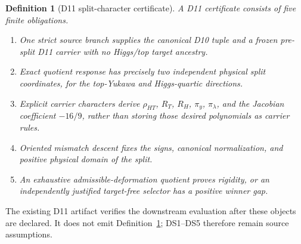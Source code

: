 \documentclass[11pt]{article}
\newtheorem{definition}[theorem]{Definition}
\begin{document}
\begin{definition}[D11 split-character certificate]\label{def:d11-split-certificate}
A D11 certificate consists of five finite obligations.
\begin{enumerate}[leftmargin=2em,label=\textup{DS\arabic*.}]
\item One strict source branch supplies the canonical D10 tuple and a frozen
pre-split D11 carrier with no Higgs/top target ancestry.
\item Exact quotient response has precisely two independent physical split
coordinates, for the top-Yukawa and Higgs-quartic directions.
\item Explicit carrier characters derive \(\rho_{HT}\), \(R_T\), \(R_H\),
\(\pi_y\), \(\pi_\lambda\), and the Jacobian coefficient \(-16/9\), rather
than storing those desired polynomials as carrier rules.
\item Oriented mismatch descent fixes the signs, canonical normalization, and
positive physical domain of the split.
\item An exhaustive admissible-deformation quotient proves rigidity, or an
independently justified target-free selector has a positive winner gap.
\end{enumerate}
\end{definition}

The existing D11 artifact verifies the downstream evaluation after these
objects are declared.  It does not emit Definition~\ref{def:d11-split-certificate};
DS1--DS5 therefore remain source assumptions.
\end{document}
